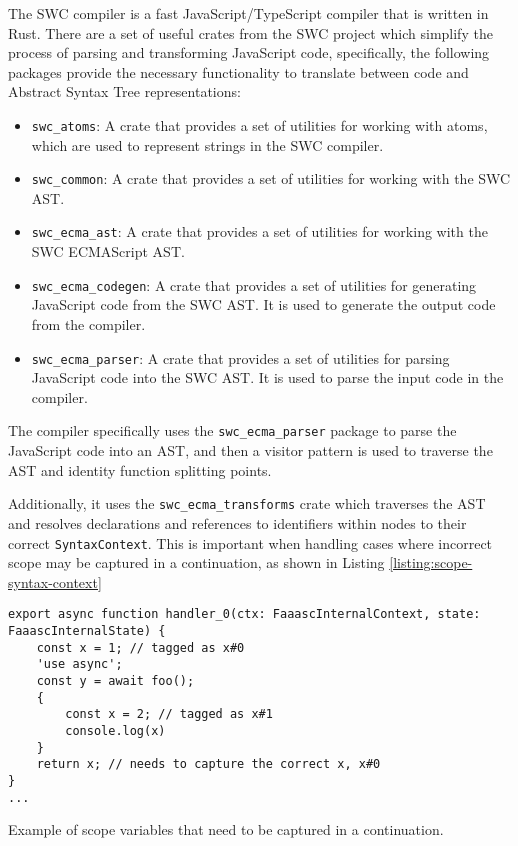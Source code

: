The SWC compiler is a fast JavaScript/TypeScript compiler that is written in Rust. There are a set of useful crates from the SWC project which simplify the process of parsing and transforming JavaScript code, specifically, the following packages provide the necessary functionality to translate between code and Abstract Syntax Tree representations:

\begin{itemize}
    \item \verb|swc_atoms|: A crate that provides a set of utilities for working with atoms, which are used to represent strings in the SWC compiler.
    \item \verb|swc_common|: A crate that provides a set of utilities for working with the SWC AST.
    \item \verb|swc_ecma_ast|: A crate that provides a set of utilities for working with the SWC ECMAScript AST.
    \item \verb|swc_ecma_codegen|: A crate that provides a set of utilities for generating JavaScript code from the SWC AST. It is used to generate the output code from the \faaasc{} compiler.
    \item \verb|swc_ecma_parser|: A crate that provides a set of utilities for parsing JavaScript code into the SWC AST. It is used to parse the input code in the \faaasc{} compiler.
\end{itemize}

The \faaasc{} compiler specifically uses the \verb|swc_ecma_parser| package to parse the JavaScript code into an AST, and then a visitor pattern is used to traverse the AST and identity function splitting points.

Additionally, it uses the \verb|swc_ecma_transforms| crate which traverses the AST and resolves declarations and references to identifiers within nodes to their correct \verb|SyntaxContext|. This is important when handling cases where incorrect scope may be captured in a continuation, as shown in Listing \ref{listing:scope-syntax-context}

\begin{listing}[H]
\begin{verbatim}
export async function handler_0(ctx: FaaascInternalContext, state: FaaascInternalState) {
    const x = 1; // tagged as x#0
    'use async';
    const y = await foo();
    {
        const x = 2; // tagged as x#1
        console.log(x)
    }
    return x; // needs to capture the correct x, x#0
}
...
\end{verbatim}
\caption{Example of scope variables that need to be captured in a continuation.}
\label{listing:scope-syntax-context}
\end{listing}

